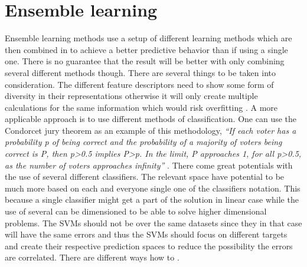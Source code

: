 
\section{Ensemble learning}

Ensemble learning methods use a setup of different learning methods which are then combined in to achieve a better predictive behavior than if using a single one. There is no guarantee that the result will be better with only combining several different methods though. There are several things to be taken into consideration. The different feature descriptors need to show some form of diversity in their representations otherwise it will only create multiple calculations for the same information which would risk overfitting \cite{cunningham2000diversity}\cite{krogh1995neural}. A more applicable approach is to use different methods of classification. One can use the Condorcet jury theorem as an example of this methodology, \textit{``If each voter has a probability p of being correct and the probability of a majority of voters being correct is P, then p>0.5 implies P>p. In the limit, P approaches 1, for all p>0.5, as the number of voters approaches infinity''} \cite{cord2008machine}\cite{grofman1983thirteen}.
There come great potentials with the use of several different classifiers. The relevant space have potential to be much more based on each and everyone single one of the classifiers notation. This because a single classifier  might get a part of the solution in linear case while the use of several can be dimensioned to be able to solve higher dimensional problems. The SVMs should not be over the same datasets since they in that case will have the same errors and thus the SVMs should focus on different targets and create their respective prediction spaces to reduce the possibility the errors are correlated. There are different ways how to \cite{kim2003ensembleSVM}. 


